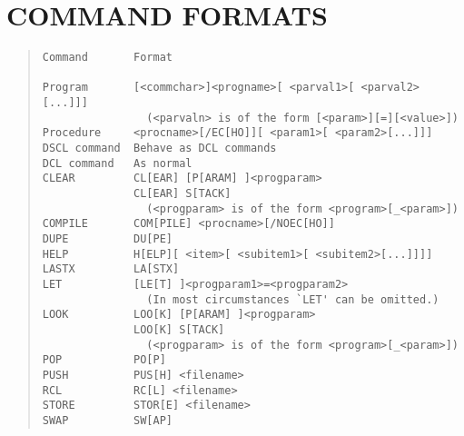 \section {COMMAND FORMATS}
\begin{quote}
\begin{verbatim}
Command       Format

Program       [<commchar>]<progname>[ <parval1>[ <parval2>[...]]]
                (<parvaln> is of the form [<param>][=][<value>])
Procedure     <procname>[/EC[HO]][ <param1>[ <param2>[...]]]
DSCL command  Behave as DCL commands
DCL command   As normal
CLEAR         CL[EAR] [P[ARAM] ]<progparam>
              CL[EAR] S[TACK]
                (<progparam> is of the form <program>[_<param>])
COMPILE       COM[PILE] <procname>[/NOEC[HO]]
DUPE          DU[PE]
HELP          H[ELP][ <item>[ <subitem1>[ <subitem2>[...]]]]
LASTX         LA[STX]
LET           [LE[T] ]<progparam1>=<progparam2>
                (In most circumstances `LET' can be omitted.)
LOOK          LOO[K] [P[ARAM] ]<progparam>
              LOO[K] S[TACK]
                (<progparam> is of the form <program>[_<param>])
POP           PO[P]
PUSH          PUS[H] <filename>
RCL           RC[L] <filename>
STORE         STOR[E] <filename>
SWAP          SW[AP]
\end{verbatim}
\end{quote}

